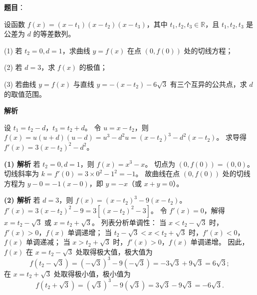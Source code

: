 \begin{answer}

\textbf{题目}：

设函数 $f(x)=(x-t_1)(x-t_2)(x-t_3)$，其中 $t_1,t_2,t_3\in\mathbb R$，且 $t_1,t_2,t_3$ 是公差为 $d$ 的等差数列。

(1) 若 $t_2=0,d=1$，求曲线 $y=f(x)$ 在点 $(0,f(0))$ 处的切线方程；

(2) 若 $d=3$，求 $f(x)$ 的极值；

(3) 若曲线 $y=f(x)$ 与直线 $y=-(x-t_2)-6\sqrt3$ 有三个互异的公共点，求 $d$ 的取值范围。

\textbf{解析}

设 $t_1=t_2-d$，$t_3=t_2+d$。
令 $u=x-t_2$，则 $f(x)=u(u+d)(u-d)=u^3-d^2 u=(x-t_2)^3-d^2(x-t_2)$。
求导得 $f'(x)=3(x-t_2)^2-d^2$。

\textbf{(1) 解析} 若 $t_2=0,d=1$，则 $f(x)=x^3-x$。
切点为 $(0,f(0))=(0,0)$。
切线斜率为 $k=f'(0)=3\times 0^2-1^2=-1$。
故曲线在点 $(0,f(0))$ 处的切线方程为 $y-0=-1(x-0)$，即 $y=-x$（或 $x+y=0$）。

\textbf{(2) 解析} 若 $d=3$，则 $f(x)=(x-t_2)^3-9(x-t_2)$。
$f'(x)=3(x-t_2)^2-9=3[(x-t_2)^2-3]$。
令 $f'(x)=0$，解得 $x=t_2-\sqrt3$ 或 $x=t_2+\sqrt3$。
列表分析单调性：
当 $x<t_2-\sqrt3$ 时，$f'(x)>0$，$f(x)$ 单调递增；
当 $t_2-\sqrt3<x<t_2+\sqrt3$ 时，$f'(x)<0$，$f(x)$ 单调递减；
当 $x>t_2+\sqrt3$ 时，$f'(x)>0$，$f(x)$ 单调递增。
因此，$f(x)$ 在 $x=t_2-\sqrt3$ 处取得极大值，极大值为
\nopagebreak[4]
\[f(t_2-\sqrt3)=(-\sqrt3)^3-9(-\sqrt3)=-3\sqrt3+9\sqrt3=6\sqrt3;\]
在 $x=t_2+\sqrt3$ 处取得极小值，极小值为
\nopagebreak[4]
\[f(t_2+\sqrt3)=(\sqrt3)^3-9(\sqrt3)=3\sqrt3-9\sqrt3=-6\sqrt3.\]


\end{answer}
